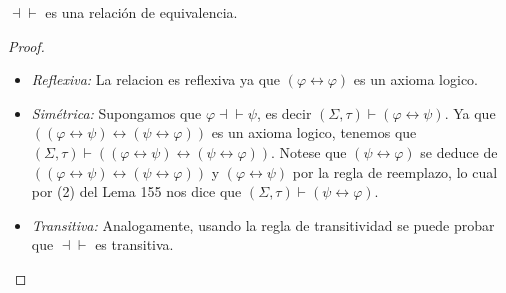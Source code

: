   \begin{lemma}
    \PN $\dashv \vdash$ es una relación de equivalencia.
  \end{lemma}
  \begin{proof}
    \begin{itemize}
      \item \textit{Reflexiva:} La relacion es reflexiva ya que $(\varphi \leftrightarrow \varphi )$ es un axioma logico.
      \item \textit{Simétrica:} Supongamos que $\varphi \dashv \vdash \psi $, es decir $(\Sigma, \tau)\vdash \left( \varphi \leftrightarrow \psi \right) $. Ya que $((\varphi \leftrightarrow \psi )\leftrightarrow (\psi \leftrightarrow \varphi ))$ es un axioma logico, tenemos que $(\Sigma, \tau)\vdash ((\varphi \leftrightarrow \psi )\leftrightarrow (\psi \leftrightarrow \varphi ))$. Notese que $\left( \psi \leftrightarrow \varphi \right) $ se deduce de $((\varphi \leftrightarrow \psi )\leftrightarrow (\psi \leftrightarrow \varphi ))$ y $(\varphi \leftrightarrow \psi )$ por la regla de reemplazo, lo cual por (2) del Lema 155 nos dice que $(\Sigma, \tau)\vdash \left( \psi \leftrightarrow \varphi \right) $.

      \item \textit{Transitiva:}   Analogamente, usando la regla de transitividad se puede probar que $\dashv \vdash $ es transitiva.
    \end{itemize}
  \end{proof}

